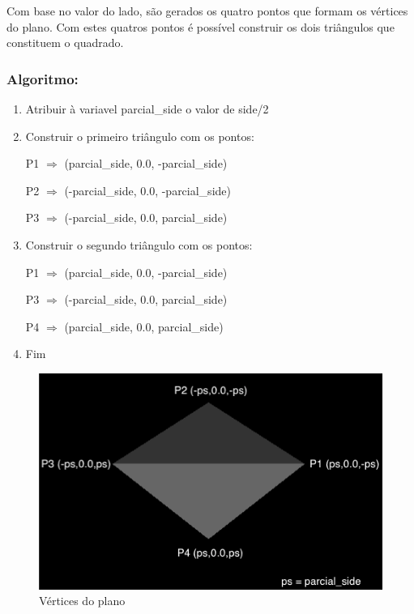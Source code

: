 \documentclass[a4paper]{article}
\begin{document}
Com base no valor do lado, são gerados os quatro pontos que formam os vértices do plano. Com estes quatros pontos é possível construir os dois triângulos que constituem o quadrado.

\subsubsection{Algoritmo:}

\ttfamily
\begin{enumerate}
  \item Atribuir à variavel parcial\_side o valor de side/2
  \item Construir o primeiro triângulo com os pontos:

        \hspace{2cm} P1 $\Rightarrow$ (parcial\_side, 0.0, -parcial\_side)

        \hspace{2cm} P2 $\Rightarrow$ (-parcial\_side, 0.0, -parcial\_side)

        \hspace{2cm} P3 $\Rightarrow$ (-parcial\_side, 0.0, parcial\_side)
  \item Construir o segundo triângulo com os pontos:

        \hspace{2cm} P1 $\Rightarrow$ (parcial\_side, 0.0, -parcial\_side)

        \hspace{2cm} P3 $\Rightarrow$ (-parcial\_side, 0.0, parcial\_side)

        \hspace{2cm} P4 $\Rightarrow$ (parcial\_side, 0.0, parcial\_side)
  \item Fim
\end{enumerate}
\rmfamily

\begin{figure}[H]
\centering
\includegraphics[scale=0.50]{plane.png}
\caption{Vértices do plano}
\label{img:glulookat}
\end{figure}
\end{document}

